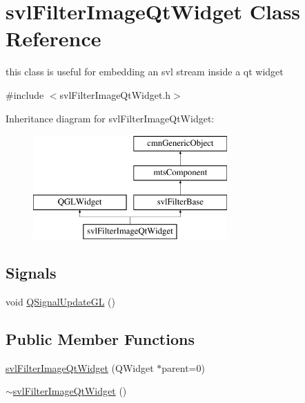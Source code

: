 \hypertarget{classsvl_filter_image_qt_widget}{}\section{svl\+Filter\+Image\+Qt\+Widget Class Reference}
\label{classsvl_filter_image_qt_widget}


this class is useful for embedding an svl stream inside a qt widget  




{\ttfamily \#include $<$svl\+Filter\+Image\+Qt\+Widget.\+h$>$}

Inheritance diagram for svl\+Filter\+Image\+Qt\+Widget\+:\begin{figure}[H]
\begin{center}
\leavevmode
\includegraphics[height=4.000000cm]{d2/db4/classsvl_filter_image_qt_widget}
\end{center}
\end{figure}
\subsection*{Signals}
\begin{DoxyCompactItemize}
\item 
void \hyperlink{classsvl_filter_image_qt_widget_a438a74443263b3ac8cbfcd568e049aac}{Q\+Signal\+Update\+G\+L} ()
\end{DoxyCompactItemize}
\subsection*{Public Member Functions}
\begin{DoxyCompactItemize}
\item 
\hyperlink{classsvl_filter_image_qt_widget_ab2cfec921bc96d27bc01837ba5e627b0}{svl\+Filter\+Image\+Qt\+Widget} (Q\+Widget $\ast$parent=0)
\item 
\hyperlink{classsvl_filter_image_qt_widget_ad7ac7d4c6f2380c318fb611de4020962}{$\sim$svl\+Filter\+Image\+Qt\+Widget} ()
\end{DoxyCompactItemize}
